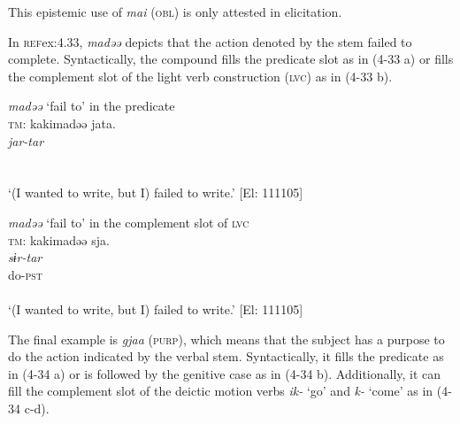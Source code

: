 This epistemic use of \textit{mai} (\textsc{obl}) is only attested in elicitation.

In \textsc{ref}{ex:4.33}, \textit{madəə} depicts that the action denoted by the stem failed to complete. Syntactically, the compound fills the predicate slot as in (4-33 a) or fills the complement slot of the light verb construction (\textsc{lvc}) as in (4-33 b).

\ea \label{ex:4.33}
\ea \textit{madəə} ‘fail to’ in the predicate \label{ex:4.33a}\\
\gllll  \textsc{tm}:  kakimadəə  jata.\\
    \textit{}  \textit{jar-tar}\\
    [write-\textsc{inf}+fail.to  \textsc{cop}-\textsc{pst}]\\
    [Nominal predicate]\\
  \glt     ‘(I wanted to write, but I) failed to write.’ [El: 111105]

\ex \textit{madəə} ‘fail to’ in the complement slot of \textsc{lvc}\\
\gllll  \textsc{tm}:  kakimadəə  sja.\\
    \textit{}  \textit{sɨr-tar}\\
    [write-\textsc{inf}+fail.to]  do-\textsc{pst}\\
    [Complement]  \\
  \glt     ‘(I wanted to write, but I) failed to write.’ [El: 111105]
  \z
\z

The final example is \textit{gjaa} (\textsc{purp}), which means that the subject has a purpose to do the action indicated by the verbal stem. Syntactically, it fills the predicate as in (4-34 a) or is followed by the genitive case as in (4-34 b). Additionally, it can fill the complement slot of the deictic motion verbs \textit{ik-} ‘go’ and \textit{k-} ‘come’ as in (4-34 c-d).

